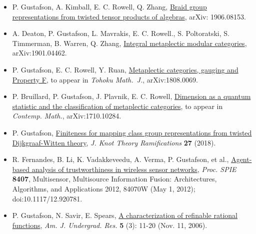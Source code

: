   \begin{itemize}

  \item[] P. Gustafson, A. Kimball, E. C. Rowell, Q. Zhang, \href{https://arxiv.org/abs/1906.08153}{Braid group representations from twisted tensor products of algebras}, arXiv: 1906.08153.

  \item[]  A. Deaton, P. Gustafson, L. Mavrakis, E. C. Rowell., S. Poltoratski, S. Timmerman, B. Warren, Q. Zhang, \href{https://arxiv.org/abs/1901.04462}{Integral metaplectic modular categories}, arXiv:1901.04462.
  
  \item[] P. Gustafson, E. C. Rowell, Y. Ruan, \href{https://arxiv.org/abs/1808.00698}{Metaplectic categories, gauging and Property F}, to appear in \emph{Tohoku Math.\ J.}, arXiv:1808.0069.

  \item[] P. Bruillard, P. Gustafson, J. Plavnik, E. C. Rowell, \href{https://arxiv.org/abs/1710.10284}{Dimension as a quantum statistic and the classification of metaplectic categories},  to appear in \emph{Contemp. Math.}, arXiv:1710.10284.
    
  \item[] P. Gustafson, \href{https://arxiv.org/abs/1610.06069}{Finiteness for mapping class group representations from twisted Dijkgraaf-Witten theory}, \emph{J. Knot Theory Ramifications} \textbf{27} (2018).

  \item[] R. Fernandes, B. Li, K. Vadakkeveedu, A. Verma, P. Gustafson, et al., \href{http://proceedings.spiedigitallibrary.org/proceeding.aspx?articleid=1354959}{Agent-based analysis of trustworthiness in wireless sensor networks}, \emph{Proc. SPIE} \textbf{8407}, Multisensor, Multisource Information Fusion: Architectures, Algorithms, and Applications 2012, 84070W (May 1, 2012); doi:10.1117/12.920781. 

 \item[] P. Gustafson, N. Savir, E. Spears, \href{http://www.uni.edu/ajur/v5n3/Gufstafson\%20et\%20al\%20new\%20pp\%2011-20.pdf}{A characterization of refinable rational functions}, \emph{Am. J. Undergrad. Res.} \textbf{5} (3): 11-20 (Nov. 11, 2006).
  
 \end{itemize}
 

